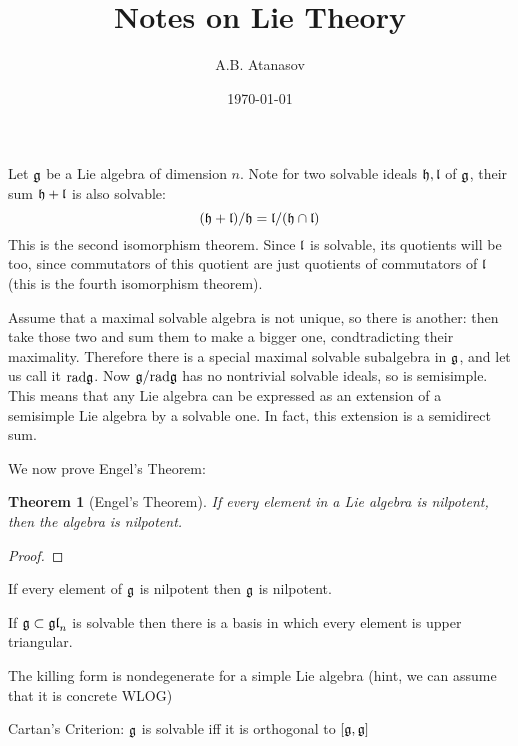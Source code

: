 \documentclass{article}
\newtheorem{theorem}{Theorem}
\begin{document}
	\title{Notes on Lie Theory}
	\author{A.B. Atanasov}
	\date{\today}
	\maketitle
	
	Let $\frak{g}$ be a Lie algebra of dimension $n$. 
	Note for two solvable ideals $\frak{h},\frak{l}$ of $\frak{g}$, their sum $\frak{h}+\frak{l}$ is also solvable:
	$$(\frak{h}+\frak{l})/\frak{h} = \frak{l}/(\frak{h} \cap \frak{l})$$	
	This is the second isomorphism theorem.
	Since $\frak{l}$ is solvable, its quotients will be too, since commutators of this quotient are just quotients of commutators of $\frak{l}$ (this is the fourth isomorphism theorem). 
	
	Assume that a maximal solvable algebra is not unique, so there is another: then take those two and sum them to make a bigger one, condtradicting their maximality. Therefore there is a special maximal solvable subalgebra in $\frak{g}$, and let us call it $\mathrm{rad} \frak{g}$. Now $\frak{g}/\mathrm{rad} \frak{g}$ has no nontrivial solvable ideals, so is semisimple. This means that any Lie algebra can be expressed as an extension of a semisimple Lie algebra by a solvable one. In fact, this extension is a semidirect sum. 
	
	We now prove Engel's Theorem:
	\begin{theorem}[Engel's Theorem]
		If every element in a Lie algebra is nilpotent, then the algebra is nilpotent.
	\end{theorem}
	\begin{proof}
		
	\end{proof}
	
	If every element of $\frak{g}$ is nilpotent then $\frak{g}$ is nilpotent.
	
	If $\frak{g} \subset \frak{gl}_n$ is solvable then there is a basis in which every element is upper triangular.

	The killing form is nondegenerate for a simple Lie algebra (hint, we can assume that it is concrete WLOG)

	Cartan's Criterion: $\frak{g}$ is solvable iff it is orthogonal to $[\frak{g},\frak{g}]$
\end{document}

